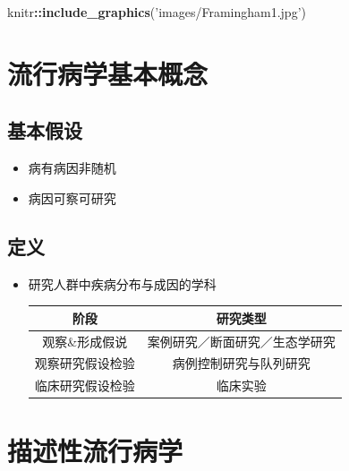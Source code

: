 \documentclass[]{book}
\newenvironment{Shaded}{\begin{snugshade}}{\end{snugshade}}
\newcommand{\KeywordTok}[1]{\textcolor[rgb]{0.13,0.29,0.53}{\textbf{#1}}}
\newcommand{\NormalTok}[1]{#1}
\newcommand{\OperatorTok}[1]{\textcolor[rgb]{0.81,0.36,0.00}{\textbf{#1}}}
\newcommand{\StringTok}[1]{\textcolor[rgb]{0.31,0.60,0.02}{#1}}
\providecommand{\tightlist}{%
  \setlength{\itemsep}{0pt}\setlength{\parskip}{0pt}}
\begin{document}
\begin{Shaded}
\begin{Highlighting}[]
\NormalTok{knitr}\OperatorTok{::}\KeywordTok{include_graphics}\NormalTok{(}\StringTok{'images/Framingham1.jpg'}\NormalTok{)}
\end{Highlighting}
\end{Shaded}

\hypertarget{ux6d41ux884cux75c5ux5b66ux57faux672cux6982ux5ff5}{%
\section{流行病学基本概念}\label{ux6d41ux884cux75c5ux5b66ux57faux672cux6982ux5ff5}}

\hypertarget{ux57faux672cux5047ux8bbe}{%
\subsection{基本假设}\label{ux57faux672cux5047ux8bbe}}

\begin{itemize}
\tightlist
\item
  病有病因非随机
\item
  病因可察可研究
\end{itemize}

\hypertarget{ux5b9aux4e49}{%
\subsection{定义}\label{ux5b9aux4e49}}

\begin{itemize}
\item
  研究人群中疾病分布与成因的学科

  \begin{longtable}[]{@{}cc@{}}
  \toprule
  阶段 & 研究类型\tabularnewline
  \midrule
  \endhead
  观察\&形成假说 & 案例研究／断面研究／生态学研究\tabularnewline
  观察研究假设检验 & 病例控制研究与队列研究\tabularnewline
  临床研究假设检验 & 临床实验\tabularnewline
  \bottomrule
  \end{longtable}
\end{itemize}

\hypertarget{ux63cfux8ff0ux6027ux6d41ux884cux75c5ux5b66}{%
\section{描述性流行病学}\label{ux63cfux8ff0ux6027ux6d41ux884cux75c5ux5b66}}
\end{document}
